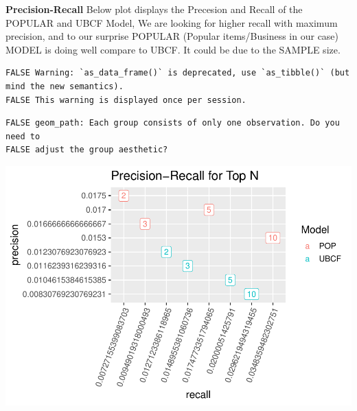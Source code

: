 \documentclass[]{article}
\newenvironment{Shaded}{\begin{snugshade}}{\end{snugshade}}
\newcommand{\DataTypeTok}[1]{\textcolor[rgb]{0.13,0.29,0.53}{#1}}
\newcommand{\DecValTok}[1]{\textcolor[rgb]{0.00,0.00,0.81}{#1}}
\newcommand{\KeywordTok}[1]{\textcolor[rgb]{0.13,0.29,0.53}{\textbf{#1}}}
\newcommand{\NormalTok}[1]{#1}
\newcommand{\OperatorTok}[1]{\textcolor[rgb]{0.81,0.36,0.00}{\textbf{#1}}}
\newcommand{\StringTok}[1]{\textcolor[rgb]{0.31,0.60,0.02}{#1}}
\begin{document}
\textbf{Precision-Recall} Below plot displays the Precesion and Recall
of the POPULAR and UBCF Model, We are looking for higher recall with
maximum precision, and to our surprise POPULAR (Popular items/Business
in our case) MODEL is doing well compare to UBCF. It could be due to the
SAMPLE size.

\begin{Shaded}
\end{Shaded}

\begin{verbatim}
FALSE Warning: `as_data_frame()` is deprecated, use `as_tibble()` (but mind the new semantics).
FALSE This warning is displayed once per session.
\end{verbatim}

\begin{verbatim}
FALSE geom_path: Each group consists of only one observation. Do you need to
FALSE adjust the group aesthetic?
\end{verbatim}

\includegraphics{report_files/figure-latex/unnamed-chunk-3-1.pdf}
\end{document}
